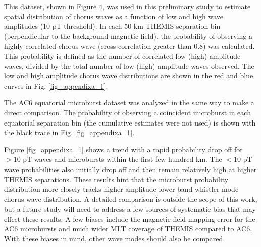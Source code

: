 \documentclass[draft]{agujournal2019}
\begin{document}
This dataset, shown in  Figure $4$, was used in this preliminary study to estimate spatial distribution of chorus waves as a function of low and high wave amplitudes (10 pT threshold). In each 50 km THEMIS separation bin (perpendicular to the background magnetic field), the probability of observing a highly correlated chorus wave (cross-correlation greater than 0.8) was calculated. This probability is defined as the number of correlated low (high) amplitude waves, divided by the total number of low (high) amplitude waves observed. The low and high amplitude chorus wave distributions are shown in the red and blue curves in  Fig. \ref{fig_appendixa_1}.

The AC6 equatorial microburst dataset was analyzed in the same way to make a direct comparison. The probability of observing a coincident microburst in each equatorial separation bin (the cumulative estimates were not used) is shown with the black trace in Fig. \ref{fig_appendixa_1}.

Figure \ref{fig_appendixa_1} shows a trend with a rapid probability drop off for $> 10$ pT waves and microbursts within the first few hundred km. The $< 10$ pT wave probabilities also initially drop off and then remain relatively high at higher THEMIS separations. These results hint that the microburst probability distribution more closely tracks higher amplitude lower band whistler mode chorus wave distribution. A detailed comparison is outside the scope of this work, but a future study will need to address a few sources of systematic bias that may effect these results. A few biases include the magnetic field mapping error for the AC6 microbursts and much wider MLT coverage of THEMIS compared to AC6. With these biases in mind, other wave modes should also be compared.
\end{document}
